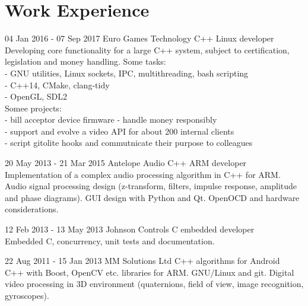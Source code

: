 \documentclass{tccv}
\begin{document}
\pagebreak
\section{Work Experience}
\begin{eventlist}
\item{04 Jan 2016 - 07 Sep 2017}
     {Euro Games Technology}
     {C++ Linux developer}                                           \\
Developing core functionality for a large C++ system, subject to certification, legislation and money handling.
Some tasks:                                                          \\
- GNU utilities, Linux sockets, IPC, multithreading, bash scripting  \\
- C++14, CMake, clang-tidy                                           \\
- OpenGL, SDL2
\\
Somee projects:                                                       \\
- bill acceptor device firmware - handle money responsibly            \\
- support and evolve a video API for about 200 internal clients       \\
- script gitolite hooks and commutnicate their purpose to colleagues  \\

\item{20 May 2013 - 21 Mar 2015}
     {Antelope Audio}
     {C++ ARM developer}              \\
Implementation of a complex audio processing algorithm in C++ for ARM.
Audio signal processing design (z-transform, filters, impulse response, amplitude and phase diagrams).
GUI design with Python and Qt.
OpenOCD and hardware considerations.   \\

\item{12 Feb 2013 - 13 May 2013}
     {Johnson Controls}
     {C embedded developer} \\
Embedded C, concurrency, unit tests and documentation.  \\

\item{22 Aug 2011 - 15 Jan 2013}
     {MM Solutions Ltd}
     {C++ algorithms for Android} \\
C++ with Boost, OpenCV etc. libraries for ARM.
GNU/Linux and git.
Digital video processing in 3D environment (quaternions, field of view, image recognition, gyroscopes).
\end{eventlist}
\end{document}
